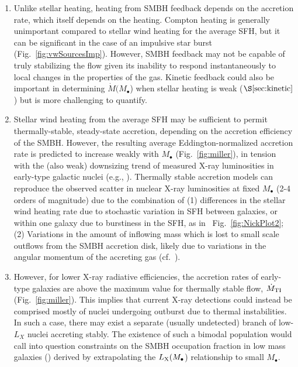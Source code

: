 \documentclass[usenatbib,fleqn]{mn2e}
\newcommand{\Mbh}[1][]{M_{\bullet#1}}
\begin{document}
\begin{enumerate}
\item Unlike stellar heating, heating from SMBH feedback depends on
  the accretion rate, which itself depends on the heating.  Compton
  heating is generally unimportant compared to stellar wind heating
  for the average SFH, but it can be significant in the case of an impulsive
  star burst (Fig.~\ref{fig:vwSourcesImp}).  However, SMBH feedback may not
  be capable of truly stabilizing the flow given its inability
  to respond instantaneously to local changes in the properties of the
  gas.  Kinetic feedback could also be important in determining
  $\dot{M}(M_{\bullet}$) when stellar heating is weak
  ($\S\ref{sec:kinetic}$) but is more challenging to quantify.

\item Stellar wind heating from the average SFH may be sufficient to
  permit thermally-stable, steady-state accretion, depending on the
  accretion efficiency of the SMBH.  However, the resulting average
  Eddington-normalized accretion rate is predicted to increase weakly
  with $M_{\bullet}$ (Fig.~\ref{fig:miller}), in tension with the
  (also weak) downsizing trend of measured X-ray luminosities in
  early-type galactic nuclei (e.g., \citealt{Miller+15}).  Thermally
  stable accretion models can reproduce the observed scatter in
  nuclear X-ray luminosities at fixed $\Mbh$ (2-4 orders of magnitude)
  due to the combination of (1) differences in the stellar wind
  heating rate due to stochastic variation in SFH between galaxies, or
  within one galaxy due to burstiness in the SFH, as in
  ~Fig.~\ref{fig:NickPlot2}; (2) Variations in the amount of inflowing
  mass which is lost to small scale outflows from the SMBH accretion
  disk, likely due to variations in the angular momentum of the
  accreting gas (cf.~\citealt{Pellegrini10}).

\item However, for lower X-ray radiative efficiencies, the accretion
  rates of early-type galaxies are above the maximum value for
  thermally stable flow, $\dot{M}_{\rm TI}$ (Fig.~\ref{fig:miller}).
  This implies that current X-ray detections could instead be
  comprised mostly of nuclei undergoing outburst due to thermal
  instabilities.  In such a case, there may exist a separate (usually
  undetected) branch of low-$L_X$ nuclei accreting stably.  The
  existence of such a bimodal population would call into question
  constraints on the SMBH occupation fraction in low mass galaxies
  (\citealt{Miller+15}) derived by extrapolating the $L_{\rm
    X}(M_{\bullet}$) relationship to small $M_{\bullet}$.


\end{enumerate}
\end{document}
